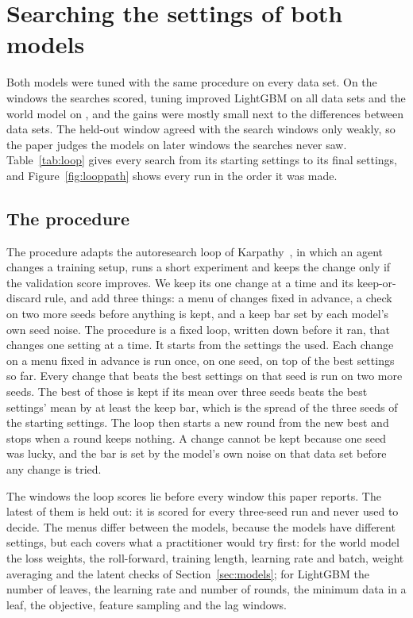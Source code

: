 \section{Searching the settings of both models}
\label{sec:loop}

Both models were tuned with the same procedure on every data set. On the windows the searches
scored, tuning improved LightGBM on all \loopImprovedLgb{} data sets and the world model on \loopImprovedWm{}, and the gains
were mostly small next to the differences between data sets. The held-out window agreed with the
search windows only weakly, so the paper judges the models on later windows the searches never
saw. Table~\ref{tab:loop} gives every search from its starting settings to its final settings, and
Figure~\ref{fig:looppath} shows every run in the order it was made.

\subsection{The procedure}

The procedure adapts the autoresearch loop of Karpathy~\cite{karpathy2026}, in which an agent changes a training
setup, runs a short experiment and keeps the change only if the validation score improves. We keep its one change
at a time and its keep-or-discard rule, and add three things: a menu of changes fixed in advance, a check on two more
seeds before anything is kept, and a keep bar set by each model's own seed noise. The procedure is a fixed loop,
written down before it ran, that changes one setting at a time. It
starts from the settings the \fvpaper{} used. Each change on a menu fixed in
advance is run once, on one seed, on top of the best settings so far. Every change that beats the
best settings on that seed is run on two more seeds. The best of those is kept if its mean over
three seeds beats the best settings' mean by at least the keep bar, which is the spread of the
three seeds of the starting settings. The loop then starts a new round from the new best and stops
when a round keeps nothing. A change cannot be kept because one seed was lucky, and the bar is set
by the model's own noise on that data set before any change is tried.

The windows the loop scores lie before every window this paper reports. The latest of them is held
out: it is scored for every three-seed run and never used to decide. The menus differ between the
models, because the models have different settings, but each covers what a practitioner would try
first: for the world model the loss weights, the roll-forward, training length, learning rate and
batch, weight averaging and the latent checks of Section~\ref{sec:models}; for LightGBM the
number of leaves, the learning rate and number of rounds, the minimum data in a leaf, the
objective, feature sampling and the lag windows.

